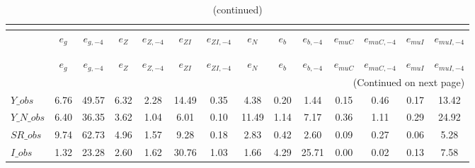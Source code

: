  
\begin{center}
\begin{longtable}{lccccccccccccc} 
\caption{VARIANCE DECOMPOSITION (in percent)}\\
 \label{Table:th_var_decomp_uncond}\\
\toprule 
$               $	 & 	 $           {e_g}$	 & 	 $      {e_{g,-4}}$	 & 	 $           {e_Z}$	 & 	 $      {e_{Z,-4}}$	 & 	 $        {e_{ZI}}$	 & 	 $     {e_{ZI,-4}}$	 & 	 $           {e_N}$	 & 	 $           {e_b}$	 & 	 $      {e_{b,-4}}$	 & 	 $       {e_{muC}}$	 & 	 $    {e_{muC,-4}}$	 & 	 $       {e_{muI}}$	 & 	 $    {e_{muI,-4}}$\\
\midrule \endfirsthead 
\caption{(continued)}\\
 \toprule \\ 
$               $	 & 	 $           {e_g}$	 & 	 $      {e_{g,-4}}$	 & 	 $           {e_Z}$	 & 	 $      {e_{Z,-4}}$	 & 	 $        {e_{ZI}}$	 & 	 $     {e_{ZI,-4}}$	 & 	 $           {e_N}$	 & 	 $           {e_b}$	 & 	 $      {e_{b,-4}}$	 & 	 $       {e_{muC}}$	 & 	 $    {e_{muC,-4}}$	 & 	 $       {e_{muI}}$	 & 	 $    {e_{muI,-4}}$\\
\midrule \endhead 
\midrule \multicolumn{14}{r}{(Continued on next page)} \\ \bottomrule \endfoot 
\bottomrule \endlastfoot 
$Y\_obs         $	 & 	            6.76	 & 	           49.57	 & 	            6.32	 & 	            2.28	 & 	           14.49	 & 	            0.35	 & 	            4.38	 & 	            0.20	 & 	            1.44	 & 	            0.15	 & 	            0.46	 & 	            0.17	 & 	           13.42 \\ 
$Y\_N\_obs      $	 & 	            6.40	 & 	           36.35	 & 	            3.62	 & 	            1.04	 & 	            6.01	 & 	            0.10	 & 	           11.49	 & 	            1.14	 & 	            7.17	 & 	            0.36	 & 	            1.11	 & 	            0.29	 & 	           24.92 \\ 
$SR\_obs        $	 & 	            9.74	 & 	           62.73	 & 	            4.96	 & 	            1.57	 & 	            9.28	 & 	            0.18	 & 	            2.83	 & 	            0.42	 & 	            2.60	 & 	            0.09	 & 	            0.27	 & 	            0.06	 & 	            5.28 \\ 
$I\_obs         $	 & 	            1.32	 & 	           23.28	 & 	            2.60	 & 	            1.62	 & 	           30.76	 & 	            1.03	 & 	            1.66	 & 	            4.29	 & 	           25.71	 & 	            0.00	 & 	            0.02	 & 	            0.13	 & 	            7.58 \\ 

\end{longtable}
\end{center}
